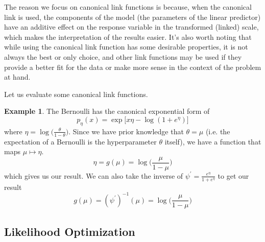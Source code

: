 \documentclass{article}
\theoremstyle{definition}
\newtheorem{example}{Example}[section]
\theoremstyle{remark}
\theoremstyle{definition}
\begin{document}
The reason we focus on canonical link functions is because, when the canonical link is used, the components of the model (the parameters of the linear predictor) have an additive effect on the response variable in the transformed (linked) scale, which makes the interpretation of the results easier. It's also worth noting that while using the canonical link function has some desirable properties, it is not always the best or only choice, and other link functions may be used if they provide a better fit for the data or make more sense in the context of the problem at hand.

Let us evaluate some canonical link functions. 

\begin{example}
The Bernoulli has the canonical exponential form of 
\[p_\eta (x) = \exp \big[ x \eta - \log (1 + e^\eta) \big]\]
where $\eta = \log \big( \frac{\theta}{1 - \theta} \big)$. Since we have prior knowledge that $\theta = \mu$ (i.e. the expectation of a Bernoulli is the hyperparameter $\theta$ itself), we have a function that maps $\mu \mapsto \eta$. 
\[\eta = g(\mu) = \log \bigg( \frac{\mu}{1 - \mu} \bigg)\]
which gives us our result. We can also take the inverse of $\psi^\prime = \frac{e^\eta}{1 + e^\eta}$ to get our result 
\[g (\mu) = (\psi^\prime)^{-1} (\mu) = \log \bigg( \frac{\mu}{1 - \mu} \bigg) \]
\end{example}

\subsection{Likelihood Optimization}
\end{document}
